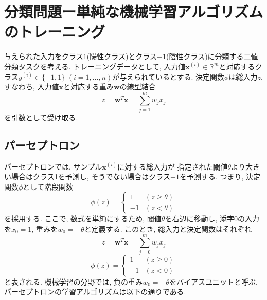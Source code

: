 \documentclass[uplatex]{jsarticle}
\theoremstyle{definition}
\numberwithin{equation}{section}
\newcommand{\R}{\mathbb{R}}
\begin{document}
\section{分類問題ー単純な機械学習アルゴリズムのトレーニング}
与えられた入力をクラス$1$(陽性クラス)とクラス$-1$(陰性クラス)に分類する二値分類タスクを考える.
トレーニングデータとして, 入力値$\bm{x}^{(i)} \in \R^{m}$と対応するクラス$y^{(i)} \in \{-1, 1\}$ $(i = 1, \dots, n)$が与えられているとする.
決定関数$\phi$は総入力$z$, すなわち, 入力値$\bm{x}$と対応する重み$\bm{w}$の線型結合
\begin{equation}
    z = \bm{w}^{T}\bm{x} = \sum_{j = 1}^{m} w_{j}x_{j}
\end{equation}
を引数として受け取る.

\subsection{パーセプトロン}
パーセプトロンでは, サンプル$\bm{x}^{(i)}$に対する総入力が
指定された閾値$\theta$より大きい場合はクラス1を予測し, 
そうでない場合はクラス$-1$を予測する.
つまり, 決定関数$\phi$として階段関数
\begin{equation}
    \phi(z) = 
    \begin{cases}
        1  & (z \geq \theta) \\
        -1 & (z < \theta)
    \end{cases}    
\end{equation}
を採用する.
ここで, 数式を単純にするため, 閾値$\theta$を右辺に移動し, 
添字$0$の入力を$x_{0} = 1$, 重みを$w_{0} = -\theta$と定義する.
このとき, 総入力と決定関数はそれぞれ
\begin{equation}
    z = \bm{w}^{T}\bm{x} = \sum_{j = 0}^{m} w_{j}x_{j}
\end{equation}
\begin{equation}
    \phi(z) = 
    \begin{cases}
        1  & (z \geq 0) \\
        -1 & (z < 0)
    \end{cases}    
\end{equation}
と表される.
機械学習の分野では, 負の重み$w_{0} = -\theta$をバイアスユニットと呼ぶ.
パーセプトロンの学習アルゴリズムは以下の通りである.
\end{document}
